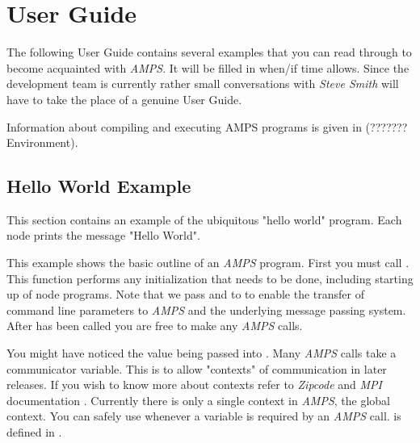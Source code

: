
\chapter{User Guide}
\label{User Guide}

The following User Guide contains several examples that you can read
through to become acquainted with {\em AMPS}.  It will be filled in
when/if time allows.  Since the development team is currently rather
small conversations with {\em Steve Smith} will have to take the place
of a genuine User Guide.

Information about compiling and executing AMPS programs is given in
(???????Environment).


\section{Hello World Example}
\label{Hello World}

This section contains an example of the ubiquitous "hello world" program.
Each node prints the message "Hello World".

This example shows the basic outline of an {\em AMPS} program.
First you must call .  This function performs any
initialization that needs to be done, including starting up of node
programs.  Note that we pass  and  to
 to enable the transfer of command line parameters to
{\em AMPS} and the underlying message passing system.  After
 has been called you are free to make any {\em AMPS}
calls.

You might have noticed the  value being passed
into .  Many {\em AMPS} calls take a communicator
variable.  This is to allow "contexts" of communication in later
releases.  If you wish to know more about contexts refer to {\em
Zipcode} and {\em MPI} documentation
\cite{SkLe90,skjellum.smith.ea.93,smith.falgout.ea.93, mpiforum.93,
mpiforum.94}.  Currently there is only a single context in {\em AMPS},
the global context.  You can safely use  whenever
a  variable is required by an {\em AMPS} call.
 is defined in .

